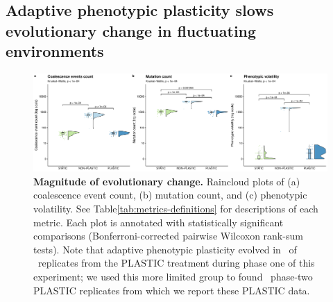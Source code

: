 \documentclass[utf8]{frontiersSCNS} %
\providecommand{\DIFaddtex}[1]{{\protect\color{blue}\uwave{#1}}} %
\providecommand{\DIFaddFL}[1]{\DIFadd{#1}} %
\providecommand{\DIFaddbeginFL}{} %
\providecommand{\DIFaddendFL}{} %
\providecommand{\DIFadd}[1]{\texorpdfstring{\DIFaddtex{#1}}{#1}} %
\newcommand{\DIFaddincludegraphics}[2][]{{\color{blue}\fbox{\DIFOincludegraphics[#1]{#2}}}} %
\DeclareRobustCommand{\DIFaddbeginFL}{\DIFOaddbeginFL \let\includegraphics\DIFaddincludegraphics} %
\DeclareRobustCommand{\DIFaddendFL}{\DIFOaddendFL \let\includegraphics\DIFOincludegraphics} %
\begin{document}
\begin{raggedbottom}
\subsection{Adaptive phenotypic plasticity slows evolutionary change in fluctuating environments}

\begin{figure}[h!]
  \centering
  \includegraphics[width=1\textwidth]{media-evolutionary-change-magnitude-panel.pdf}
  \caption{\small
  \textbf{Magnitude of evolutionary change.}
  Raincloud plots\DIFaddbeginFL \DIFaddFL{~}\DIFaddendFL \citep{allen_raincloud_2019} of
  (a) coalescence event count,
  (b) mutation count,
  and (c) phenotypic volatility.
  See Table\DIFaddbeginFL \DIFaddFL{~}\DIFaddendFL \ref{tab:metrics-definitions} for descriptions of each metric.
  Each plot is annotated with statistically significant comparisons (Bonferroni-corrected pairwise Wilcoxon rank-sum tests).
  Note that adaptive phenotypic plasticity evolved in \evolutionaryChangeRatePlasticReps\ of \evolutionaryChangeRateReplicates\ replicates from the PLASTIC treatment during phase one of this experiment; we used this more limited group to found \evolutionaryChangeRatePlasticReps\ phase-two PLASTIC replicates from which we report these PLASTIC data.
  }
  \label{fig:evolutionary-dynamics-magnitude}
\end{figure}




\end{raggedbottom}
\end{document}
